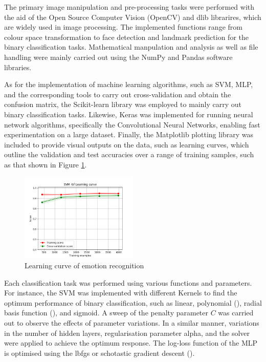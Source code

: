 \documentclass[conference]{IEEEtran}
\begin{document}

The primary image manipulation and pre-processing tasks were performed with the aid of the Open Source Computer Vision (OpenCV) and dlib librarires, which are widely used in image processing. The implemented functions range from colour space transformation to face detection and landmark prediction for the binary classification tasks. 
Mathematical manpulation and analysis as well as file handling were mainly carried out using the NumPy and Pandas software libraries.

As for the implementation of machine learning algorithms, such as SVM, MLP, and the corresponding tools to carry out cross-validation and obtain the confusion matrix, the Scikit-learn library was employed to mainly carry out binary classification tasks. 
Likewise, Keras was implemented for running neural network algorithms, specifically the Convolutional Neural Networks, enabling fast experimentation on a large dataset.
Finally, the Matplotlib plotting library was included to provide visual outputs on the data, such as learning curves, which outline the validation and test accuracies over a range of training samples, such as that shown in Figure \ref{fig: T1-LC}.

\begin{figure} [h] %
  \centering
    \includegraphics[width=0.5\textwidth]{graphs/T1_SVM_RBF} 
    \caption{Learning curve of emotion recognition}
    \label{fig: T1-LC}
\end{figure}

Each classification task was performed using various functions and parameters. For instance, the SVM was implemented with different Kernels to find the optimum performance of binary classification, such as linear, polynomial (), radial basis function (), and sigmoid. A sweep of the penalty parameter $C$ was carried out to observe the effects of parameter variations.
In a similar manner, variations in the number of hidden layers, regularisation parameter alpha, and the solver were applied to achieve the optimum response. The log-loss function of the MLP is optimised using the lbfgs or schotastic gradient descent ().
\end{document}
